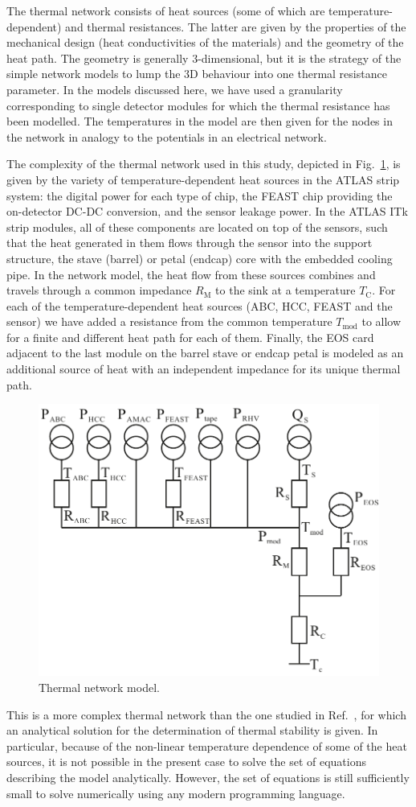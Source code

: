 The thermal network consists of heat sources (some of which are temperature-dependent) and thermal resistances. The latter are given by the properties of the mechanical design (heat conductivities of the materials) and the geometry of the heat path. The geometry is generally 3-dimensional, but it is the strategy of the simple network models to lump the 3D behaviour into one thermal resistance parameter. In the models discussed here, we have used a granularity corresponding to single detector modules for which the thermal resistance has been modelled. The temperatures in the model are then given for the nodes in the network in analogy to the potentials in an electrical network.

The complexity of the thermal network used in this study, depicted in Fig.~\ref{fig:thermalmodel}, is given by the variety of temperature-dependent heat sources in the ATLAS strip system: the digital power for each type of chip, the FEAST chip providing the on-detector DC-DC conversion, and the sensor leakage power. In the ATLAS ITk strip modules, all of these components are located on top of the sensors, such that the heat generated in them flows through the sensor into the support structure, the stave (barrel) or petal (endcap) core with the embedded cooling pipe. In the network model, the heat flow from these sources combines and travels through a common impedance $R_\text{M}$ to the sink at a temperature $T_\text{C}$. For each of the temperature-dependent heat sources (ABC, HCC, FEAST and the sensor) we have added a resistance from the common temperature $T_\text{mod}$ to allow for a finite and different heat path for each of them. Finally, the EOS card adjacent to the last module on the barrel stave or endcap petal is modeled as an additional source of heat with an independent impedance for its unique thermal path.

\begin{figure}[ht]
\centering
\includegraphics[width=0.6\linewidth]{figures/Thermalmodel.pdf}
\caption{Thermal network model.}
\label{fig:thermalmodel}
\end{figure}

This is a more complex thermal network than the one studied in Ref.~\cite{Beck:2010zzd}, for which an analytical solution for the determination of thermal stability is given. In particular, because of the non-linear temperature dependence of some of the heat sources, it is not possible in the present case to solve the set of equations describing the model analytically. However, the set of equations is still sufficiently small to solve numerically using any modern programming language.

